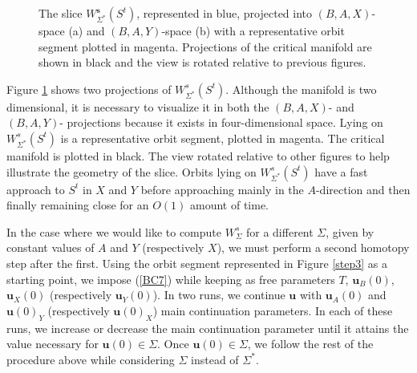 \documentclass{ws-ijbc}
\begin{document}
\begin{figure}[h]
\centering
{}
\caption{The slice $W^{\mathbf{s}}_{\Sigma^*}(S^t)$, represented in blue, projected into $(B,A,X)$-space (a) and $(B,A,Y)$-space (b) with a representative orbit segment plotted in magenta.  Projections of the critical manifold are shown in black and the view is rotated relative to previous figures.}
\label{piece}
\end{figure}
   
Figure \ref{piece} shows two projections of $W^s_{\Sigma^*}(S^t)$.  Although the manifold is two dimensional, it is necessary to visualize it in both the $(B,A,X)$- and $(B,A,Y)$- projections because it exists in four-dimensional space.  Lying on $W^s_{\Sigma^*}(S^t)$ is a representative orbit segment, plotted in magenta.  The critical manifold is plotted in black.  The view rotated relative to other figures to help illustrate the geometry of the slice.  Orbits lying on $W^s_{\Sigma^*}(S^t)$ have a fast approach to $S^t$ in $X$ and $Y$ before approaching mainly in the $A$-direction and then finally remaining close for an $O(1)$ amount of time.
    
In the case where we would like to compute $W^{s}_{\Sigma}$ for a different $\Sigma$, given by constant values of $A$ and $Y$ (respectively $X$), we must perform a second homotopy step after the first.  Using the orbit segment represented in Figure \ref{step3} as a starting point, we impose (\ref{BC7}) while keeping as free parameters $T$, $\mathbf{u}_B(0)$, $\mathbf{u}_X(0)$ (respectively $\mathbf{u}_Y(0)$).  In two runs, we continue $\mathbf{u}$ with $\mathbf{u}_A(0)$ and $\mathbf{u}(0)_Y$ (respectively $\mathbf{u}(0)_X$) main continuation parameters.  In each of these runs, we increase or decrease the main continuation parameter until it attains the value necessary for $\mathbf{u}(0) \in \Sigma$.  Once $\mathbf{u}(0) \in \Sigma$, we follow the rest of the procedure above while considering $\Sigma$ instead of $\Sigma^*$.
    
\end{document}
